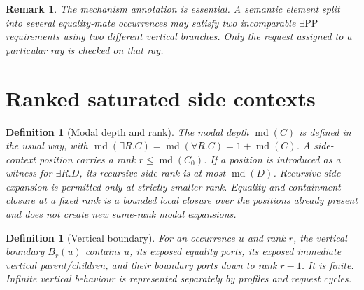 \documentclass[11pt]{article}
\newtheorem{definition}[theorem]{Definition}
\newtheorem{remark}[theorem]{Remark}
\newcommand{\md}{\operatorname{md}}
\newcommand{\PP}{\mathrm{PP}}
\begin{document}
\begin{remark}
The mechanism annotation is essential.  A semantic element split into several equality-mate occurrences may satisfy two incomparable $\exists\PP$ requirements using two different vertical branches.  Only the request assigned to a particular ray is checked on that ray.
\end{remark}

\section{Ranked saturated side contexts}

\begin{definition}[Modal depth and rank]
The modal depth $\md(C)$ is defined in the usual way, with $\md(\exists R.C)=\md(\forall R.C)=1+\md(C)$.  A side-context position carries a rank $r\leq \md(C_0)$.  If a position is introduced as a witness for $\exists R.D$, its recursive side-rank is at most $\md(D)$.  Recursive side expansion is permitted only at strictly smaller rank.  Equality and containment closure at a fixed rank is a bounded local closure over the positions already present and does not create new same-rank modal expansions.
\end{definition}

\begin{definition}[Vertical boundary]
For an occurrence $u$ and rank $r$, the vertical boundary $B_r(u)$ contains $u$, its exposed equality ports, its exposed immediate vertical parent/children, and their boundary ports down to rank $r-1$.  It is finite.  Infinite vertical behaviour is represented separately by profiles and request cycles.
\end{definition}
\end{document}
